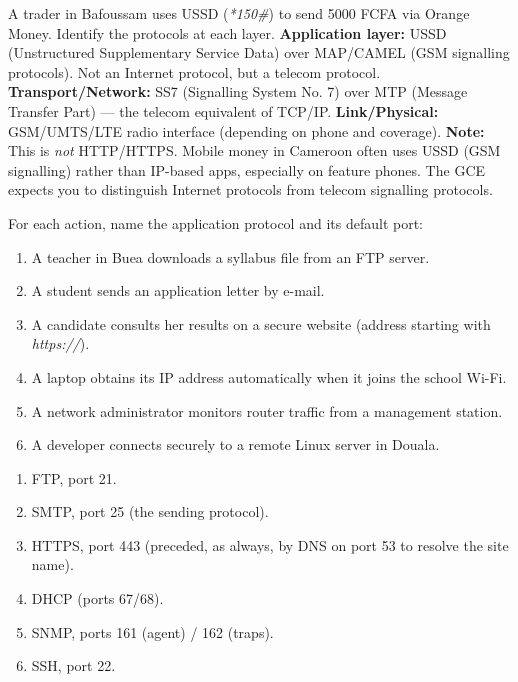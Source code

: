 \documentclass[11pt]{article}
\begin{document}
\begin{exoresolu}
A trader in Bafoussam uses USSD (\emph{*150\#}) to send 5000 FCFA via Orange Money. Identify the protocols at each layer.
\tcblower
\textbf{Application layer:} USSD (Unstructured Supplementary Service Data) over MAP/CAMEL (GSM signalling protocols). Not an Internet protocol, but a telecom protocol.
\textbf{Transport/Network:} SS7 (Signalling System No. 7) over MTP (Message Transfer Part) --- the telecom equivalent of TCP/IP.
\textbf{Link/Physical:} GSM/UMTS/LTE radio interface (depending on phone and coverage).
\textbf{Note:} This is \emph{not} HTTP/HTTPS. Mobile money in Cameroon often uses USSD (GSM signalling) rather than IP-based apps, especially on feature phones. The GCE expects you to distinguish Internet protocols from telecom signalling protocols.
\end{exoresolu}

\begin{exercice}
For each action, name the application protocol and its default port:
\begin{enumerate}
\item A teacher in Buea downloads a syllabus file from an FTP server.
\item A student sends an application letter by e-mail.
\item A candidate consults her results on a secure website (address starting with \emph{https://}).
\item A laptop obtains its IP address automatically when it joins the school Wi-Fi.
\item A network administrator monitors router traffic from a management station.
\item A developer connects securely to a remote Linux server in Douala.
\end{enumerate}
\end{exercice}

\begin{corrige}[Exercise 1]
\begin{enumerate}
\item FTP, port 21.
\item SMTP, port 25 (the sending protocol).
\item HTTPS, port 443 (preceded, as always, by DNS on port 53 to resolve the site name).
\item DHCP (ports 67/68).
\item SNMP, ports 161 (agent) / 162 (traps).
\item SSH, port 22.
\end{enumerate}
\end{corrige}
\end{document}
